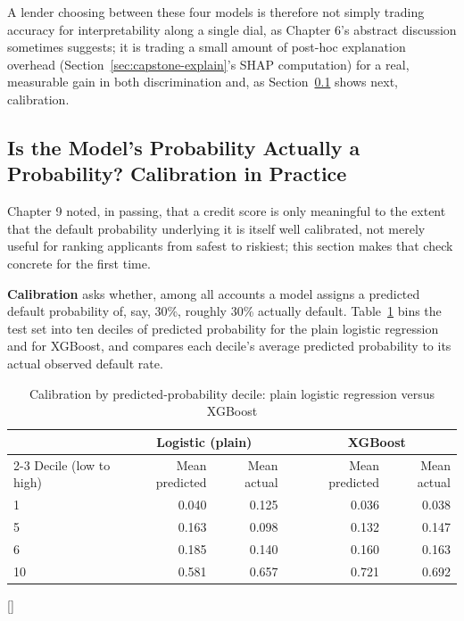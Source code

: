 \documentclass[../ai_in_finance]{subfiles}
\begin{document}
A lender choosing between these four models is therefore not simply trading accuracy for interpretability along a single dial, as Chapter 6's abstract discussion sometimes suggests; it is trading a small amount of post-hoc explanation overhead (Section~\ref{sec:capstone-explain}'s SHAP computation) for a real, measurable gain in both discrimination and, as Section~\ref{sec:capstone-calibration} shows next, calibration.

\subsection{Is the Model's Probability Actually a Probability? Calibration in Practice}
\label{sec:capstone-calibration}

Chapter 9 noted, in passing, that a credit score is only meaningful to the extent that the default probability underlying it is itself well calibrated, not merely useful for ranking applicants from safest to riskiest; this section makes that check concrete for the first time.

\textbf{Calibration} asks whether, among all accounts a model assigns a predicted default probability of, say, 30\%, roughly 30\% actually default. Table~\ref{tab:capstone_calibration} bins the test set into ten deciles of predicted probability for the plain logistic regression and for XGBoost, and compares each decile's average predicted probability to its actual observed default rate.

\begin{table}[htbp]
\centering
\begin{lrbox}{\bookmeasuredbox}
\small
\begin{tabular}{lrrrrr}
\toprule
& \multicolumn{2}{c}{Logistic (plain)} & & \multicolumn{2}{c}{XGBoost} \\
\cmidrule{2-3} \cmidrule{5-6}
Decile (low to high) & Mean predicted & Mean actual & & Mean predicted & Mean actual \\
\midrule
1 & 0.040 & 0.125 & & 0.036 & 0.038 \\
5 & 0.163 & 0.098 & & 0.132 & 0.147 \\
6 & 0.185 & 0.140 & & 0.160 & 0.163 \\
10 & 0.581 & 0.657 & & 0.721 & 0.692 \\
\bottomrule
\end{tabular}
\end{lrbox}
\ifdim\wd\bookmeasuredbox<0.65\linewidth
\setlength{\bookcapwidth}{0.65\linewidth}
\else
\setlength{\bookcapwidth}{\wd\bookmeasuredbox}
\fi
{}[\bookcapwidth]{
\usebox{\bookmeasuredbox}
}{
\caption{Calibration by predicted-probability decile: plain logistic regression versus XGBoost}
\label{tab:capstone_calibration}
}
\end{table}
\end{document}
